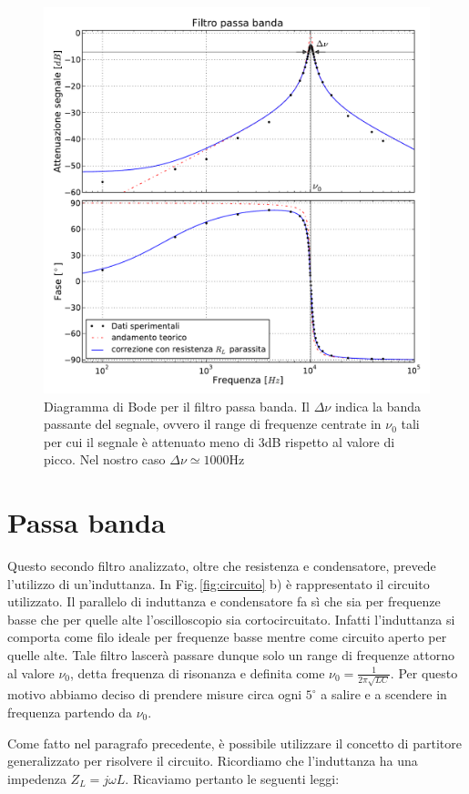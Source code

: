 \begin{figure}
    \includegraphics[width=115mm]{bpf2.pdf}
    \caption{Diagramma di Bode per il filtro passa banda. Il $\Delta \nu$ indica la banda passante del segnale, ovvero il range di frequenze centrate in $\nu_0$ tali per cui il segnale è attenuato meno di 3dB rispetto al valore di picco. Nel nostro caso $\Delta \nu \simeq 1000 \si{\hertz}$}
    \label{fig:bpf}
\end{figure}

\section{Passa banda}
Questo secondo filtro analizzato, oltre che resistenza e condensatore, prevede l'utilizzo di un'induttanza. In Fig.$\,$\ref{fig:circuito} b) è rappresentato il circuito utilizzato. Il parallelo di induttanza e condensatore fa sì che sia per frequenze basse che per quelle alte l'oscilloscopio sia cortocircuitato. Infatti l'induttanza si comporta come filo ideale per frequenze basse mentre come circuito aperto per quelle alte. Tale filtro lascerà passare dunque solo un range di frequenze attorno al valore $\nu_0$, detta frequenza di risonanza e definita come $\nu_0=\frac{1}{2 \pi \sqrt{LC}}$. Per questo motivo abbiamo deciso di prendere misure circa ogni $5^\circ$ a salire e a scendere in frequenza partendo da $\nu_0$.

Come fatto nel paragrafo precedente, è possibile utilizzare il concetto di partitore generalizzato per risolvere il circuito. Ricordiamo che l'induttanza ha una impedenza $Z_L=j\omega L$. Ricaviamo pertanto le seguenti leggi:

